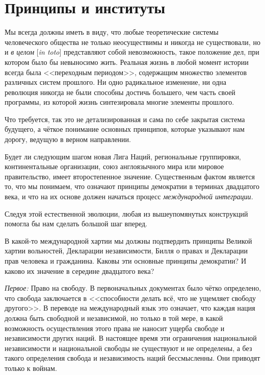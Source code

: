 \chapter{Принципы и институты}

Мы всегда должны иметь в виду, что любые теоретические системы человеческого общества не только неосуществимы и никогда не существовали, но и \textit{в целом} [\textit{in toto}] представляют собой невозможность, такое положение дел, при котором было бы невыносимо жить. Реальная жизнь в любой момент истории всегда была <<переходным периодом>>, содержащим множество элементов различных систем прошлого. Ни одно радикальное изменение, ни одна революция никогда не были способны достичь большего, чем часть своей программы, из которой жизнь синтезировала многие элементы прошлого.
 
Что требуется, так это не детализированная и сама по себе закрытая система будущего, а чёткое понимание основных принципов, которые указывают нам дорогу, ведущую в верном направлении.

Будет ли следующим шагом новая Лига Наций, региональные группировки, континентальные организации, союз англоязычного мира или мировое правительство, имеет второстепенное значение. Существенным фактом является то, что мы понимаем, что означают принципы демократии в терминах двадцатого века, и что на их основе должен начаться процесс \textit{международной интеграции}.
 
Следуя этой естественной эволюции, любая из вышеупомянутых конструкций помогла бы нам сделать большой шаг вперед.

В какой-то международной хартии мы должны подтвердить принципы Великой хартии вольностей, Декларации независимости, Билля о правах и Декларации прав человека и гражданина. Каковы эти основные принципы демократии? И каково их значение в середине двадцатого века?
 
\textit{Первое:} Право на свободу. В первоначальных документах было чётко определено, что свобода заключается в <<способности делать всё, что не ущемляет свободу другого>>. В переводе на международный язык это означает, что каждая нация должна быть свободной и независимой, но только в той мере, в какой возможность осуществления этого права не наносит ущерба свободе и независимости других наций. В настоящее время эти ограничения национальной независимости и национальной свободы не существуют и не определены, а без такого определения свобода и независимость наций бессмысленны. Они приводят только к войнам.

